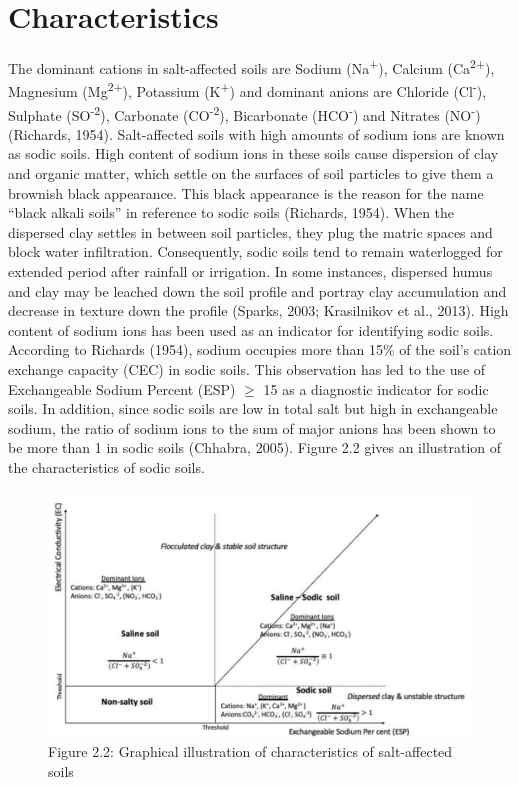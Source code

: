\documentclass[
  10pt,
  b5paper,
]{book}
\begin{document}
\hypertarget{characteristics}{%
\section{Characteristics}\label{characteristics}}

The dominant cations in salt-affected soils are Sodium (Na\textsuperscript{+}), Calcium (Ca\textsuperscript{2+}), Magnesium (Mg\textsuperscript{2+}), Potassium (K\textsuperscript{+}) and dominant anions are Chloride (Cl\textsuperscript{-}), Sulphate (SO\textsuperscript{-2}), Carbonate (CO\textsuperscript{-2}), Bicarbonate (HCO\textsuperscript{-}) and Nitrates (NO\textsuperscript{-}) (Richards, 1954). Salt-affected soils with high amounts of sodium ions are known as sodic soils. High content of sodium ions in these soils cause dispersion of clay and organic matter, which settle on the surfaces of soil particles to give them a brownish black appearance. This black appearance is the reason for the name ``black alkali soils'' in reference to sodic soils (Richards, 1954). When the dispersed clay settles in between soil particles, they plug the matric spaces and block water infiltration. Consequently, sodic soils tend to remain waterlogged for extended period after rainfall or irrigation. In some instances, dispersed humus and clay may be leached down the soil profile and portray clay accumulation and decrease in texture down the profile (Sparks, 2003; Krasilnikov et al., 2013).
High content of sodium ions has been used as an indicator for identifying sodic soils. According to Richards (1954), sodium occupies more than 15\% of the soil's cation exchange capacity (CEC) in sodic soils. This observation has led to the use of Exchangeable Sodium Percent (ESP) \(\geq\) 15 as a diagnostic indicator for sodic soils. In addition, since sodic soils are low in total salt but high in exchangeable sodium, the ratio of sodium ions to the sum of major anions has been shown to be more than 1 in sodic soils (Chhabra, 2005). Figure 2.2 gives an illustration of the characteristics of sodic soils.

\begin{figure}
\centering
\includegraphics{figures/images/Figure2.2.jpg}
\caption{Figure 2.2: Graphical illustration of characteristics of salt-affected soils}
\end{figure}
\end{document}
